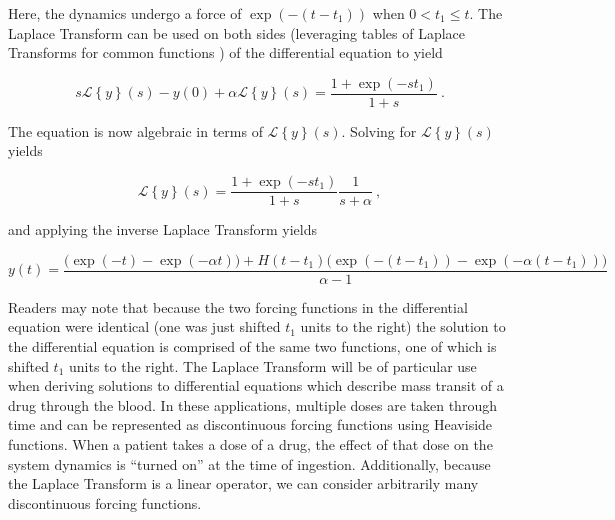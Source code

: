 \noindent Here, the dynamics undergo a force of $\exp(-(t-t_1))$ when $0<t_1 \leq t$.  The Laplace Transform can be used on both sides (leveraging tables of Laplace Transforms for common functions \cite{boyce2021elementary}) of the differential equation to yield

$$ s\mathcal{L}\left\{y\right\}(s) - y(0) + \alpha \mathcal{L}\left\{y\right\}(s) = \dfrac{1 + \exp(-st_1)}{1+s} \>.  $$

\noindent The equation is now algebraic in terms of $\mathcal{L}\left\{y\right\}(s)$.  Solving for $\mathcal{L}\left\{y\right\}(s)$ yields

\begin{equation}
	\mathcal{L}\left\{y\right\}(s) =  \dfrac{1 + \exp(-st_1)}{1+s} \dfrac{1}{s+\alpha} \>,
\end{equation}

\noindent and applying the inverse Laplace Transform yields

\begin{equation}
	y(t) = \dfrac{\Big(\exp(-t) - \exp(-\alpha t)\Big) + H(t-t_1)\Big(\exp(-(t-t_1)) - \exp(-\alpha(t-t_1))\Big)}{\alpha-1}
\end{equation}

\noindent  Readers may note that because the two forcing functions in the differential equation were identical (one was just shifted $t_1$ units to the right) the solution to the differential equation is comprised of the same two functions, one of which is shifted $t_1$ units to the right.  The Laplace Transform will be of particular use when deriving solutions to differential equations which describe mass transit of a drug through the blood.  In these applications, multiple doses are taken through time and can be represented as discontinuous forcing functions using Heaviside functions.  When a patient takes a dose of a drug, the effect of that dose on the system dynamics is ``turned on'' at the time of ingestion. Additionally, because the Laplace Transform is a linear operator, we can consider arbitrarily many discontinuous forcing functions.